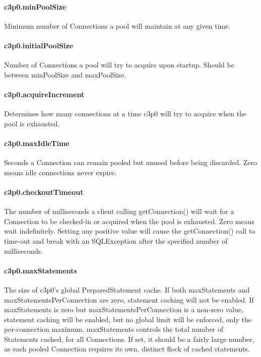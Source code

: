 \paragraph{c3p0.minPoolSize}
Minimum number of Connections a pool will maintain at any given time.

\paragraph{c3p0.initialPoolSize}
Number of Connections a pool will try to acquire upon startup. Should be between
minPoolSize and maxPoolSize.

\paragraph{c3p0.acquireIncrement}
Determines how many connections at a time c3p0 will try to acquire when the pool
is exhausted.

\paragraph{c3p0.maxIdleTime}
Seconds a Connection can remain pooled but unused before being discarded. Zero
means idle connections never expire.

\paragraph{c3p0.checkoutTimeout}
The number of milliseconds a client calling getConnection() will wait for a Connection
to be checked-in or acquired when the pool is exhausted. Zero means wait indefinitely.
Setting any positive value will cause the getConnection() call to time-out and
break with an SQLException after the specified number of milliseconds.

\paragraph{c3p0.maxStatements}
The size of c3p0's global PreparedStatement cache. If both maxStatements and
maxStatementsPerConnection are zero, statement caching will not be enabled.
If maxStatements is zero but maxStatementsPerConnection is a non-zero value,
statement caching will be enabled, but no global limit will be enforced, only
the per-connection maximum. maxStatements controls the total number of Statements
cached, for all Connections. If set, it should be a fairly large number, as each
pooled Connection requires its own, distinct flock of cached statements.

